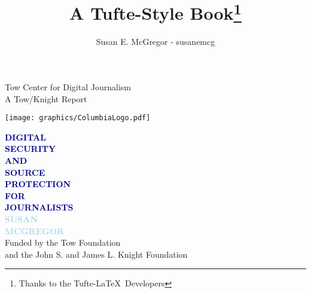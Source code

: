 \documentclass{tufte-book}
\title{A Tufte-Style Book\thanks{Thanks to the Tufte-LaTeX\ Developers}}
\author{Susan E. McGregor - susanemcg}
\newcommand{\blankpage}{\newpage\hbox{}\thispagestyle{empty}\newpage}
\begin{document}
\frontmatter

\blankpage



\begin{minipage}[t][1\textheight]{0.40\textwidth}
\vspace{0pt}
\begin{flushleft}
\small\textsf{Tow Center for Digital Journalism\\
A Tow/Knight Report}
\end{flushleft}
\vfill
\texttt{[image: graphics/ColumbiaLogo.pdf]}
\end{minipage}%
\hfill
\begin{minipage}[t][1\textheight]{70mm}
\vspace{0pt}
\Huge\textcolor{darkblue}{\textbf{{\titlefont DIGITAL\\ SECURITY\\
AND\\
SOURCE\\ PROTECTION\\
FOR\\
JOURNALISTS\\
\textcolor{lightblue}{
SUSAN\\
MCGREGOR\\
}
}
}}
\vfill
\small\textsf{Funded by the Tow Foundation\\
and the John S. and James L. Knight Foundation}
\end{minipage}%
\end{document}
